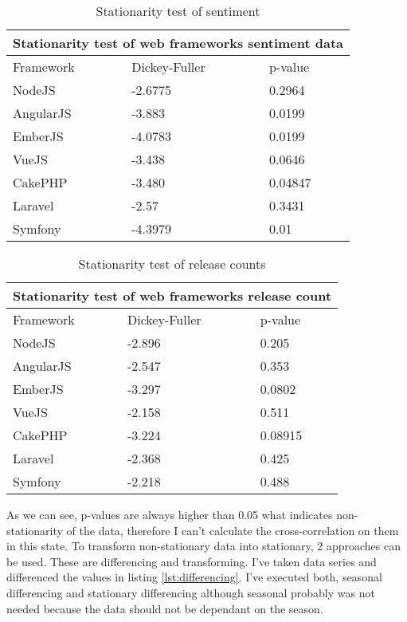 \begin{table}[H]
\centering
\begin{tabular}{ |p{3cm}||p{3cm}|p{3cm}|  }
 \hline
 \multicolumn{3}{|c|}{Stationarity test of web frameworks sentiment data} \\
 \hline
 Framework & Dickey-Fuller & p-value\\
 \hline
 NodeJS   & -2.6775    &0.2964\\ \hline
 AngularJS &   -3.883  & 0.0199\\ \hline
 EmberJS & -4.0783 & 0.0199\\ \hline
 VueJS    &-3.438 & 0.0646\\ \hline
 CakePHP&   -3.480  & 0.04847\\ \hline
 Laravel& -2.57  & 0.3431\\ \hline
 Symfony& -4.3979  & 0.01\\ \hline
\end{tabular}
\caption{Stationarity test of sentiment}
\label{table:stationarity_table_sentiment}
\end{table}

\begin{table}[H]
\centering
\begin{tabular}{ |p{3cm}||p{3cm}|p{3cm}|  }
 \hline
 \multicolumn{3}{|c|}{Stationarity test of web frameworks release count} \\
 \hline
 Framework & Dickey-Fuller & p-value\\
 \hline
 NodeJS   & -2.896    &0.205\\ \hline
 AngularJS &   -2.547  & 0.353\\ \hline
 EmberJS & -3.297 & 0.0802\\ \hline
 VueJS    &-2.158 & 0.511\\ \hline
 CakePHP&   -3.224  & 0.08915\\ \hline
 Laravel& -2.368  & 0.425\\ \hline
 Symfony& -2.218  & 0.488\\ \hline
\end{tabular}
\caption{Stationarity test of release counts}
\label{table:stationarity_table_release_count}
\end{table}

As we can see, p-values are always higher than 0.05 what indicates non-stationarity of the data, therefore I can't calculate the cross-correlation on them in this state. To transform non-stationary data into stationary, 2 approaches can be used. These are differencing and transforming.  I've taken data series and differenced the values in listing \ref{lst:differencing}. I've executed both, seasonal differencing and stationary differencing although seasonal probably was not needed because the data should not be dependant on the season.

